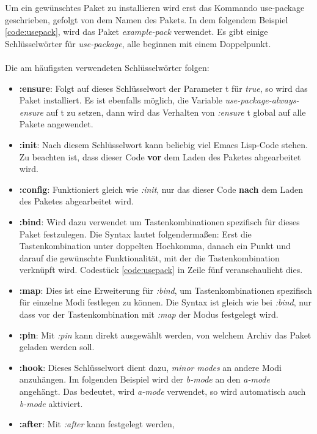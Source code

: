 Um ein gewünschtes Paket zu installieren wird erst das Kommando
{\glqq}use-package{\grqq} geschrieben, gefolgt von dem Namen des
Pakets. In dem folgendem Beispiel \ref{code:usepack}, wird das Paket
\textit{example-pack} verwendet. Es gibt einige Schlüsselwörter für
\textit{use-package}, alle beginnen mit einem
Doppelpunkt. \cite{UsePackage}\\\\ Die am häufigsten verwendeten
Schlüsselwörter folgen:
\begin{itemize}
\item \textbf{:ensure}: Folgt auf dieses Schlüsselwort der Parameter
  {\glqq}t{\grqq} für \textit{true}, so wird das Paket installiert. Es
  ist ebenfalls möglich, die Variable
  \textit{use-package-always-ensure} auf {\glqq}t{\grqq} zu setzen,
  dann wird das Verhalten von {\glqq}\textit{:ensure} t{\grqq} global
  auf alle Pakete angewendet.
\item \textbf{:init}: Nach diesem Schlüsselwort kann beliebig viel
  Emacs Lisp-Code stehen. Zu beachten ist, dass dieser Code
  \textbf{vor} dem Laden des Paketes abgearbeitet wird.
\item \textbf{:config}: Funktioniert gleich wie \textit{:init}, nur
  das dieser Code \textbf{nach} dem Laden des Paketes abgearbeitet
  wird.
\item \textbf{:bind}: Wird dazu verwendet um Tastenkombinationen
  spezifisch für dieses Paket festzulegen. Die Syntax lautet
  folgendermaßen: Erst die Tastenkombination unter doppelten
  Hochkomma, danach ein Punkt und darauf die gewünschte
  Funktionalität, mit der die Tastenkombination verknüpft
  wird. Codestück \ref{code:usepack} in Zeile fünf veranschaulicht
  dies.
\item \textbf{:map}: Dies ist eine Erweiterung für \textit{:bind}, um
  Tastenkombinationen spezifisch für einzelne Modi festlegen zu
  können. Die Syntax ist gleich wie bei \textit{:bind}, nur dass vor
  der Tastenkombination mit \textit{:map} der Modus festgelegt wird.
\item \textbf{:pin}: Mit \textit{:pin} kann direkt ausgewählt werden,
  von welchem Archiv das Paket geladen werden soll.
\item \textbf{:hook}: Dieses Schlüsselwort dient dazu, \textit{minor
  modes} an andere Modi anzuhängen. Im folgenden Beispiel wird der
  \textit{b-mode} an den \textit{a-mode} angehängt. Das bedeutet, wird
  \textit{a-mode} verwendet, so wird automatisch auch \textit{b-mode}
  aktiviert.
\item \textbf{:after}: Mit \textit{:after} kann festgelegt werden,

\end{itemize}
